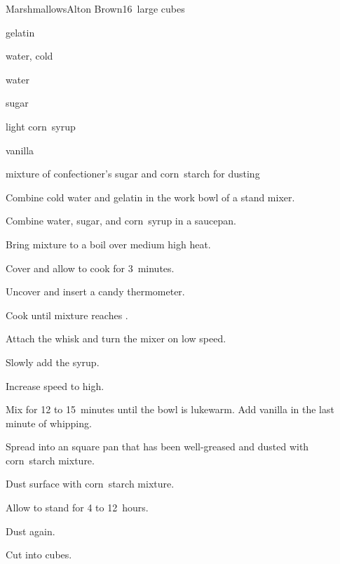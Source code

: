 \begin{recipe}{Marshmallows}{Alton Brown}{16~large cubes}

\begin{ingredients}
\item {} gelatin
\item \C{\quarter} water, cold
\item \C{\quarter} water
\item {} sugar
\item \C{\half} light corn~syrup
\item \tp{\half} vanilla
\item mixture of confectioner's sugar and corn~starch for dusting
\end{ingredients}

\begin{directions}
\item Combine cold water and gelatin in the work bowl of a stand mixer.
\item Combine water, sugar, and corn~syrup in a saucepan.
\item Bring mixture to a boil over medium high heat.
\item Cover and allow to cook for 3~minutes.
\item Uncover and insert a candy thermometer.
\item Cook until mixture reaches .
\item Attach the whisk and turn the mixer on low speed.
\item Slowly add the syrup.
\item Increase speed to high.
\item Mix for 12 to 15~minutes until the bowl is lukewarm. Add vanilla in the last minute of whipping.
\item Spread into an  square pan that has been well-greased and dusted with corn~starch mixture.
\item Dust surface with corn~starch mixture.
\item Allow to stand for 4 to 12~hours.
\item Dust again.
\item Cut into cubes.
\end{directions}

\end{recipe}
